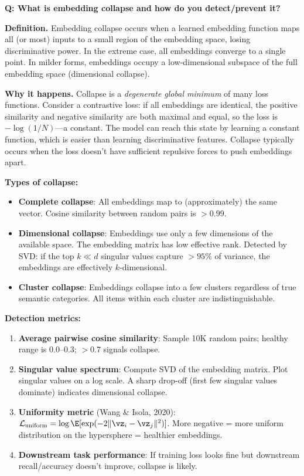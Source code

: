 \begin{interviewq}
\textbf{Q: What is embedding collapse and how do you detect/prevent it?}

 \quad {} \quad \badgefreq{\freqmed}

\stronganswer

\textbf{Definition.} Embedding collapse occurs when a learned embedding function maps all (or most) inputs to a small region of the embedding space, losing discriminative power. In the extreme case, all embeddings converge to a single point. In milder forms, embeddings occupy a low-dimensional subspace of the full embedding space (dimensional collapse).

\textbf{Why it happens.} Collapse is a \textit{degenerate global minimum} of many loss functions. Consider a contrastive loss: if all embeddings are identical, the positive similarity and negative similarity are both maximal and equal, so the loss is $-\log(1/N)$---a constant. The model can reach this state by learning a constant function, which is easier than learning discriminative features. Collapse typically occurs when the loss doesn't have sufficient repulsive forces to push embeddings apart.

\textbf{Types of collapse:}
\begin{itemize}
    \item \textbf{Complete collapse}: All embeddings map to (approximately) the same vector. Cosine similarity between random pairs is $>0.99$.
    \item \textbf{Dimensional collapse}: Embeddings use only a few dimensions of the available space. The embedding matrix has low effective rank. Detected by SVD: if the top $k \ll d$ singular values capture $>95\%$ of variance, the embeddings are effectively $k$-dimensional.
    \item \textbf{Cluster collapse}: Embeddings collapse into a few clusters regardless of true semantic categories. All items within each cluster are indistinguishable.
\end{itemize}

\textbf{Detection metrics:}
\begin{enumerate}
    \item \textbf{Average pairwise cosine similarity}: Sample 10K random pairs; healthy range is 0.0--0.3; $>$0.7 signals collapse.
    \item \textbf{Singular value spectrum}: Compute SVD of the embedding matrix. Plot singular values on a log scale. A sharp drop-off (first few singular values dominate) indicates dimensional collapse.
    \item \textbf{Uniformity metric} (Wang \& Isola, 2020): $\mathcal{L}_{\text{uniform}} = \log \E[\exp(-2\|\vz_i - \vz_j\|^2)]$. More negative = more uniform distribution on the hypersphere = healthier embeddings.
    \item \textbf{Downstream task performance}: If training loss looks fine but downstream recall/accuracy doesn't improve, collapse is likely.
\end{enumerate}


\end{interviewq}
